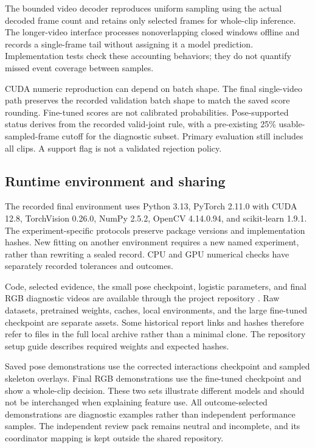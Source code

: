 The bounded video decoder reproduces uniform sampling using the actual decoded frame count and retains only selected frames for whole-clip inference. The longer-video interface processes nonoverlapping closed windows offline and records a single-frame tail without assigning it a model prediction. Implementation tests check these accounting behaviors; they do not quantify missed event coverage between samples.

CUDA numeric reproduction can depend on batch shape. The final single-video path preserves the recorded validation batch shape to match the saved score rounding. Fine-tuned scores are not calibrated probabilities. Pose-supported status derives from the recorded valid-joint rule, with a pre-existing 25\% usable-sampled-frame cutoff for the diagnostic subset. Primary evaluation still includes all clips. A support flag is not a validated rejection policy.

\subsection{Runtime environment and sharing}
The recorded final environment uses Python 3.13, PyTorch 2.11.0 with CUDA 12.8, TorchVision 0.26.0, NumPy 2.5.2, OpenCV 4.14.0.94, and scikit-learn 1.9.1. The experiment-specific protocols preserve package versions and implementation hashes. New fitting on another environment requires a new named experiment, rather than rewriting a sealed record. CPU and GPU numerical checks have separately recorded tolerances and outcomes.

Code, selected evidence, the small pose checkpoint, logistic parameters, and final RGB diagnostic videos are available through the project repository \cite{projectrepo}. Raw datasets, pretrained weights, caches, local environments, and the large fine-tuned checkpoint are separate assets. Some historical report links and hashes therefore refer to files in the full local archive rather than a minimal clone. The repository setup guide describes required weights and expected hashes.

Saved pose demonstrations use the corrected interactions checkpoint and sampled skeleton overlays. Final RGB demonstrations use the fine-tuned checkpoint and show a whole-clip decision. These two sets illustrate different models and should not be interchanged when explaining feature use. All outcome-selected demonstrations are diagnostic examples rather than independent performance samples. The independent review pack remains neutral and incomplete, and its coordinator mapping is kept outside the shared repository.
